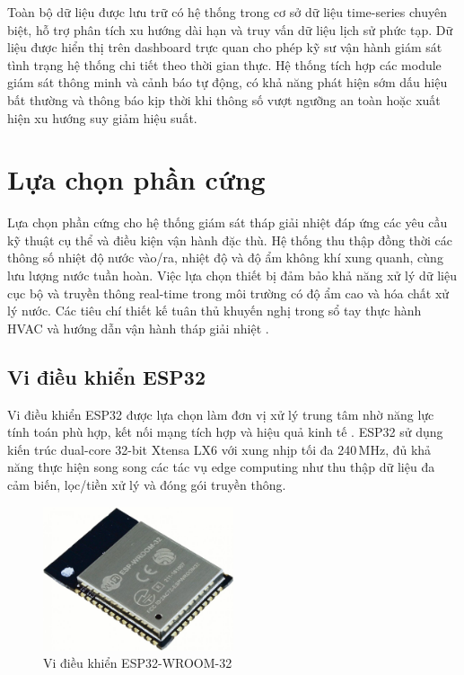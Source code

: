 \documentclass[../main.tex]{subfiles}
\begin{document}
Toàn bộ dữ liệu được lưu trữ có hệ thống trong cơ sở dữ liệu time-series chuyên biệt, hỗ trợ phân tích xu hướng dài hạn và truy vấn dữ liệu lịch sử phức tạp. Dữ liệu được hiển thị trên dashboard trực quan cho phép kỹ sư vận hành giám sát tình trạng hệ thống chi tiết theo thời gian thực. Hệ thống tích hợp các module giám sát thông minh và cảnh báo tự động, có khả năng phát hiện sớm dấu hiệu bất thường và thông báo kịp thời khi thông số vượt ngưỡng an toàn hoặc xuất hiện xu hướng suy giảm hiệu suất.

\section{Lựa chọn phần cứng}
\label{sec:hardware_selection}

Lựa chọn phần cứng cho hệ thống giám sát tháp giải nhiệt đáp ứng các yêu cầu kỹ thuật cụ thể và điều kiện vận hành đặc thù. Hệ thống thu thập đồng thời các thông số nhiệt độ nước vào/ra, nhiệt độ và độ ẩm không khí xung quanh, cùng lưu lượng nước tuần hoàn. Việc lựa chọn thiết bị đảm bảo khả năng xử lý dữ liệu cục bộ và truyền thông real-time trong môi trường có độ ẩm cao và hóa chất xử lý nước. Các tiêu chí thiết kế tuân thủ khuyến nghị trong sổ tay thực hành HVAC và hướng dẫn vận hành tháp giải nhiệt \cite{ashrae2020cooling,epa_cooling_tower_guide_2017}.

\subsection{Vi điều khiển ESP32}
\label{sec:esp32_controller}

Vi điều khiển ESP32 được lựa chọn làm đơn vị xử lý trung tâm nhờ năng lực tính toán phù hợp, kết nối mạng tích hợp và hiệu quả kinh tế \cite{Espressif_ESP32_technical_reference}. ESP32 sử dụng kiến trúc dual-core 32-bit Xtensa LX6 với xung nhịp tối đa 240\,MHz, đủ khả năng thực hiện song song các tác vụ edge computing như thu thập dữ liệu đa cảm biến, lọc/tiền xử lý và đóng gói truyền thông.

\begin{figure}[H]
    \centering
    \includegraphics[width=0.5\textwidth]{../Hinhve/ESP32-WROOM-32-1059x800.jpg}
    \caption{Vi điều khiển ESP32-WROOM-32 \cite{Espressif_ESP32_technical_reference}}
    \label{fig:esp32}
\end{figure}
\end{document}
